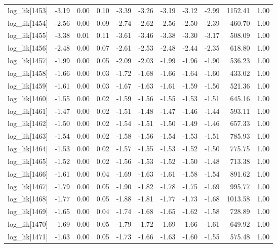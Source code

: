 \begin{table}[ht]
\begin{tabular}{rrrrrrrrrrr}
  log\_lik[1453] & -3.19 & 0.00 & 0.10 & -3.39 & -3.26 & -3.19 & -3.12 & -2.99 & 1152.41 & 1.00 \\ 
  log\_lik[1454] & -2.56 & 0.00 & 0.09 & -2.74 & -2.62 & -2.56 & -2.50 & -2.39 & 460.70 & 1.00 \\ 
  log\_lik[1455] & -3.38 & 0.01 & 0.11 & -3.61 & -3.46 & -3.38 & -3.30 & -3.17 & 508.09 & 1.00 \\ 
  log\_lik[1456] & -2.48 & 0.00 & 0.07 & -2.61 & -2.53 & -2.48 & -2.44 & -2.35 & 618.80 & 1.00 \\ 
  log\_lik[1457] & -1.99 & 0.00 & 0.05 & -2.09 & -2.03 & -1.99 & -1.96 & -1.90 & 536.23 & 1.00 \\ 
  log\_lik[1458] & -1.66 & 0.00 & 0.03 & -1.72 & -1.68 & -1.66 & -1.64 & -1.60 & 433.02 & 1.00 \\ 
  log\_lik[1459] & -1.61 & 0.00 & 0.03 & -1.67 & -1.63 & -1.61 & -1.59 & -1.56 & 521.36 & 1.00 \\ 
  log\_lik[1460] & -1.55 & 0.00 & 0.02 & -1.59 & -1.56 & -1.55 & -1.53 & -1.51 & 645.16 & 1.00 \\ 
  log\_lik[1461] & -1.47 & 0.00 & 0.02 & -1.51 & -1.48 & -1.47 & -1.46 & -1.44 & 593.11 & 1.00 \\ 
  log\_lik[1462] & -1.50 & 0.00 & 0.02 & -1.54 & -1.51 & -1.50 & -1.49 & -1.46 & 657.33 & 1.00 \\ 
  log\_lik[1463] & -1.54 & 0.00 & 0.02 & -1.58 & -1.56 & -1.54 & -1.53 & -1.51 & 785.93 & 1.00 \\ 
  log\_lik[1464] & -1.53 & 0.00 & 0.02 & -1.57 & -1.55 & -1.53 & -1.52 & -1.50 & 775.75 & 1.00 \\ 
  log\_lik[1465] & -1.52 & 0.00 & 0.02 & -1.56 & -1.53 & -1.52 & -1.50 & -1.48 & 713.38 & 1.00 \\ 
  log\_lik[1466] & -1.61 & 0.00 & 0.04 & -1.69 & -1.63 & -1.61 & -1.58 & -1.54 & 891.62 & 1.00 \\ 
  log\_lik[1467] & -1.79 & 0.00 & 0.05 & -1.90 & -1.82 & -1.78 & -1.75 & -1.69 & 995.77 & 1.00 \\ 
  log\_lik[1468] & -1.77 & 0.00 & 0.05 & -1.88 & -1.81 & -1.77 & -1.73 & -1.68 & 1013.58 & 1.00 \\ 
  log\_lik[1469] & -1.65 & 0.00 & 0.04 & -1.74 & -1.68 & -1.65 & -1.62 & -1.58 & 728.89 & 1.00 \\ 
  log\_lik[1470] & -1.69 & 0.00 & 0.05 & -1.79 & -1.72 & -1.69 & -1.66 & -1.61 & 649.92 & 1.00 \\ 
  log\_lik[1471] & -1.63 & 0.00 & 0.05 & -1.73 & -1.66 & -1.63 & -1.60 & -1.55 & 575.48 & 1.00 \\ 

\end{tabular}
\end{table}
